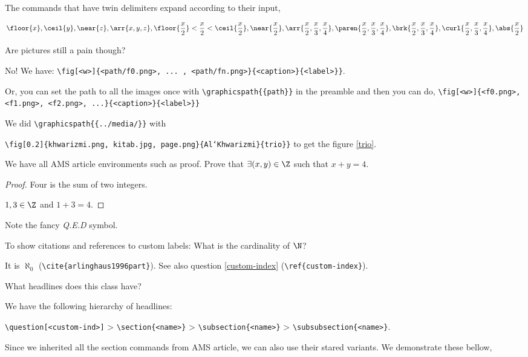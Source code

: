 \documentclass{homework}
\newcommand{\bk}{\textbackslash}
\begin{document}
The commands that have twin delimiters expand according to their input,

\[
  \floor{x}, \ceil{y}, \near{z}, \arr{x,y,z},
  \floor{\frac{x}{2}} < \frac{x}{2} < \ceil{\frac{x}{2}},
  \near{\frac{x}{2}},
  \arr{\frac{x}{2}, \frac{x}{3}, \frac{x}{4}},
  \paren{\frac{x}{2}, \frac{x}{3}, \frac{x}{4}},
  \brk{\frac{x}{2}, \frac{x}{3}, \frac{x}{4}},
  \curl{\frac{x}{2}, \frac{x}{3}, \frac{x}{4}},
  \abs{\frac{x}{2}}
\]

\question Are pictures still a pain though?

No! We have: \texttt{\bk fig[<w>]\{<path/f0.png>, ... , <path/fn.png>\}\{<caption>\}\{<label>\}\}}.

Or, you can set the path to all the images once with \texttt{\bk graphicspath\{\{path\}\}} in the preamble and then you can do, \texttt{\bk fig[<w>]\{<f0.png>, <f1.png>, <f2.png>, ...\}\{<caption>\}\{<label>\}\}}

We did \texttt{\bk graphicspath\{\{../media/\}\}} with

\texttt{\bk fig[0.2]\{khwarizmi.png, kitab.jpg, page.png\}\{Al`Khwarizmi\}\{trio\}\}} to get the figure \ref{trio}.



\question We have all AMS article environments such as proof. Prove that $\exists (x,y) \in \Z$ such that $x+y = 4$.
\begin{proof} Four is the sum of two integers.

  $1,3 \in \Z$ and $1+3=4$.
\end{proof}
Note the fancy \textit{Q.E.D} symbol.

\question{\label{cardinality}} To show citations and references to custom labels: What is the cardinality of $\N$?

It is $\aleph_0$ \cite{arlinghaus1996part} (\texttt{\bk cite\{arlinghaus1996part\}}). See also question \ref{custom-index} (\texttt{\bk ref\{custom-index\}}).

\question What headlines does this class have?

We have the following hierarchy of headlines:

\texttt{\bk question[<custom-ind>]} > \texttt{\bk section\{<name>\}} > \texttt{\bk subsection\{<name>\}} > \texttt{\bk subsubsection\{<name>\}}.

Since we inherited all the section commands from AMS article, we can also use their stared variants. We demonstrate these bellow,
\end{document}

